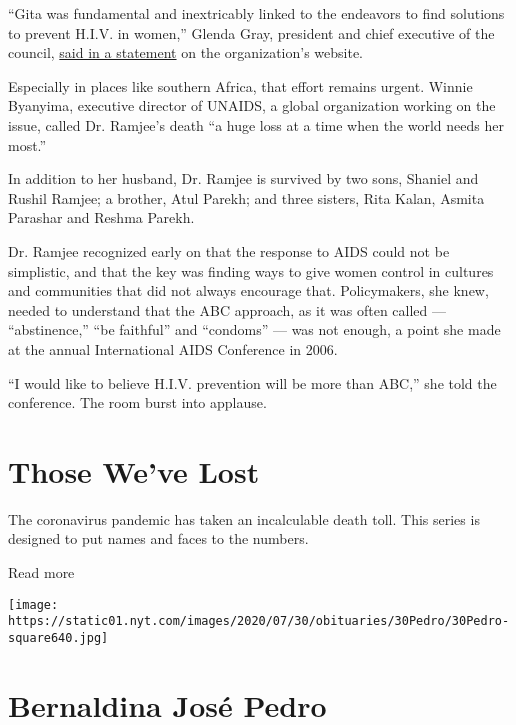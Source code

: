 ``Gita was fundamental and inextricably linked to the endeavors to find
solutions to prevent H.I.V. in women,'' Glenda Gray, president and chief
executive of the council,
\href{https://www.samrc.ac.za/media-release/samrc-mourns-loss-eminent-scientist-prof-gita-ramjee}{said
in a statement} on the organization's website.

Especially in places like southern Africa, that effort remains urgent.
Winnie Byanyima, executive director of UNAIDS, a global organization
working on the issue, called Dr. Ramjee's death ``a huge loss at a time
when the world needs her most.''

In addition to her husband, Dr. Ramjee is survived by two sons, Shaniel
and Rushil Ramjee; a brother, Atul Parekh; and three sisters, Rita
Kalan, Asmita Parashar and Reshma Parekh.

Dr. Ramjee recognized early on that the response to AIDS could not be
simplistic, and that the key was finding ways to give women control in
cultures and communities that did not always encourage that.
Policymakers, she knew, needed to understand that the ABC approach, as
it was often called --- ``abstinence,'' ``be faithful'' and ``condoms''
--- was not enough, a point she made at the annual International AIDS
Conference in 2006.

``I would like to believe H.I.V. prevention will be more than ABC,'' she
told the conference. The room burst into applause.

\href{https://www.nytimes.com/interactive/2020/obituaries/people-died-coronavirus-obituaries.html?action=click\&pgtype=Article\&state=default\&region=BELOW_MAIN_CONTENT\&context=covid_obits_promo}{}

\hypertarget{those-weve-lost}{%
\section{Those We've Lost}\label{those-weve-lost}}

The coronavirus pandemic has taken an incalculable death toll. This
series is designed to put names and faces to the numbers.

Read more

\texttt{[image: https://static01.nyt.com/images/2020/07/30/obituaries/30Pedro/30Pedro-square640.jpg]}

\hypertarget{bernaldina-josuxe9-pedro}{%
\section{Bernaldina José Pedro}\label{bernaldina-josuxe9-pedro}}

